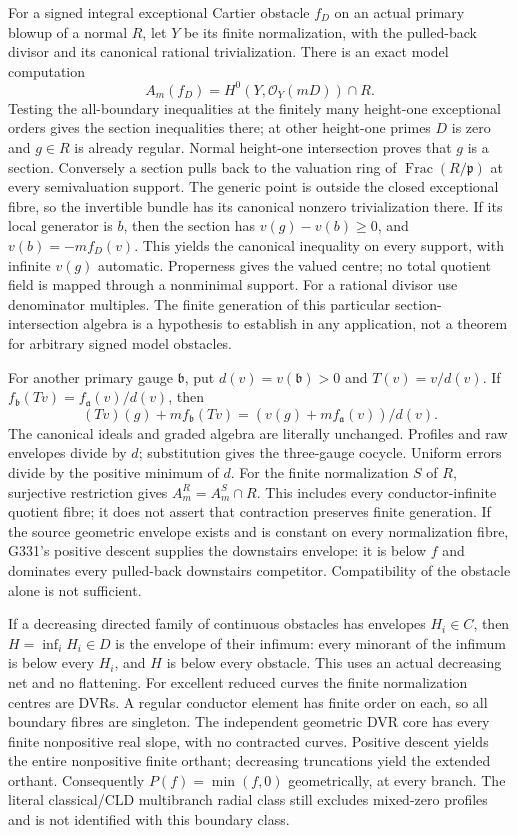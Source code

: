 For a signed integral exceptional Cartier obstacle $f_D$ on an actual primary blowup of a normal $R$, let $Y$ be its finite normalization, with the pulled-back divisor and its canonical rational trivialization. There is an exact model computation
\[
 A_m(f_D)=H^0(Y,\mathcal O_Y(mD))\cap R. \tag{6a}
\]
Testing the all-boundary inequalities at the finitely many height-one exceptional orders gives the section inequalities there; at other height-one primes $D$ is zero and $g\in R$ is already regular. Normal height-one intersection proves that $g$ is a section. Conversely a section pulls back to the valuation ring of $\operatorname{Frac}(R/\mathfrak p)$ at every semivaluation support. The generic point is outside the closed exceptional fibre, so the invertible bundle has its canonical nonzero trivialization there. If its local generator is $b$, then the section has $v(g)-v(b)\ge0$, and $v(b)=-mf_D(v)$. This yields the canonical inequality on every support, with infinite $v(g)$ automatic. Properness gives the valued centre; no total quotient field is mapped through a nonminimal support. For a rational divisor use denominator multiples. The finite generation of this particular section-intersection algebra is a hypothesis to establish in any application, not a theorem for arbitrary signed model obstacles.

For another primary gauge $\mathfrak b$, put $d(v)=v(\mathfrak b)>0$ and $T(v)=v/d(v)$. If $f_{\mathfrak b}(Tv)=f_{\mathfrak a}(v)/d(v)$, then
\[
 (Tv)(g)+mf_{\mathfrak b}(Tv)=(v(g)+mf_{\mathfrak a}(v))/d(v).
\]
The canonical ideals and graded algebra are literally unchanged. Profiles and raw envelopes divide by $d$; substitution gives the three-gauge cocycle. Uniform errors divide by the positive minimum of $d$. For the finite normalization $S$ of $R$, surjective restriction gives $A_m^R=A_m^S\cap R$. This includes every conductor-infinite quotient fibre; it does not assert that contraction preserves finite generation. If the source geometric envelope exists and is constant on every normalization fibre, G331's positive descent supplies the downstairs envelope: it is below $f$ and dominates every pulled-back downstairs competitor. Compatibility of the obstacle alone is not sufficient.

If a decreasing directed family of continuous obstacles has envelopes $H_i\in C$, then $H=\inf_iH_i\in D$ is the envelope of their infimum: every minorant of the infimum is below every $H_i$, and $H$ is below every obstacle. This uses an actual decreasing net and no flattening. For excellent reduced curves the finite normalization centres are DVRs. A regular conductor element has finite order on each, so all boundary fibres are singleton. The independent geometric DVR core has every finite nonpositive real slope, with no contracted curves. Positive descent yields the entire nonpositive finite orthant; decreasing truncations yield the extended orthant. Consequently $P(f)=\min(f,0)$ geometrically, at every branch. The literal classical/CLD multibranch radial class still excludes mixed-zero profiles and is not identified with this boundary class.

